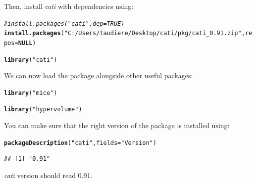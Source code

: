 \documentclass[12pt]{article}\usepackage[]{graphicx}\usepackage[]{color}
\makeatletter
\newcommand{\hlstr}[1]{\textcolor[rgb]{0.192,0.494,0.8}{#1}}%
\newcommand{\hlcom}[1]{\textcolor[rgb]{0.678,0.584,0.686}{\textit{#1}}}%
\newcommand{\hlstd}[1]{\textcolor[rgb]{0.345,0.345,0.345}{#1}}%
\newcommand{\hlkwa}[1]{\textcolor[rgb]{0.161,0.373,0.58}{\textbf{#1}}}%
\newcommand{\hlkwc}[1]{\textcolor[rgb]{0.333,0.667,0.333}{#1}}%
\newcommand{\hlkwd}[1]{\textcolor[rgb]{0.737,0.353,0.396}{\textbf{#1}}}%
\newenvironment{kframe}{%
 \def\at@end@of@kframe{}%
 \ifinner\ifhmode%
  \def\at@end@of@kframe{\end{minipage}}%
  \begin{minipage}{\columnwidth}%
 \fi\fi%
 \def\FrameCommand##1{\hskip\@totalleftmargin \hskip-\fboxsep
 \colorbox{shadecolor}{##1}\hskip-\fboxsep
     \hskip-\linewidth \hskip-\@totalleftmargin \hskip\columnwidth}%
 \MakeFramed {\advance\hsize-\width
   \@totalleftmargin\z@ \linewidth\hsize
   \@setminipage}}%
 {\par\unskip\endMakeFramed%
 \at@end@of@kframe}
\newenvironment{knitrout}{}{} %
\makeatother
\begin{document}
Then, install \textit{cati} with dependencies using:
\begin{knitrout}
\color{fgcolor}\begin{kframe}
\begin{alltt}
\hlcom{#install.packages("cati", dep=TRUE)}
\hlkwd{install.packages}\hlstd{(}\hlstr{"C:/Users/taudiere/Desktop/cati/pkg/cati_0.91.zip"}\hlstd{,} \hlkwc{repos}\hlstd{=}\hlkwa{NULL}\hlstd{)}
\end{alltt}


{\ttfamily\noindent\itshape\color{messagecolor}{\#\# Installing package into 'C:/Users/taudiere/Documents/R/win-library/3.1'\\\#\# (as 'lib' is unspecified)}}\begin{alltt}
\hlkwd{library}\hlstd{(}\hlstr{"cati"}\hlstd{)}
\end{alltt}


{\ttfamily\noindent\itshape\color{messagecolor}{\#\# Loading required package: nlme\\\#\# Loading required package: ade4\\\#\# Loading required package: ape}}\end{kframe}
\end{knitrout}

We can now load the package alongside other useful packages:
\begin{knitrout}
\color{fgcolor}\begin{kframe}
\begin{alltt}
\hlkwd{library}\hlstd{(}\hlstr{"mice"}\hlstd{)}
\end{alltt}


{\ttfamily\noindent\itshape\color{messagecolor}{\#\# Loading required package: Rcpp\\\#\# Loading required package: lattice\\\#\# mice 2.22 2014-06-10}}\begin{alltt}
\hlkwd{library}\hlstd{(}\hlstr{"hypervolume"}\hlstd{)}
\end{alltt}


{\ttfamily\noindent\itshape\color{messagecolor}{\#\# Loading required package: rgl}}\end{kframe}
\end{knitrout}

\noindent You can make sure that the right version of the package is installed using:
\begin{knitrout}
\color{fgcolor}\begin{kframe}
\begin{alltt}
\hlkwd{packageDescription}\hlstd{(}\hlstr{"cati"}\hlstd{,} \hlkwc{fields} \hlstd{=} \hlstr{"Version"}\hlstd{)}
\end{alltt}
\begin{verbatim}
## [1] "0.91"
\end{verbatim}
\end{kframe}
\end{knitrout}
\textit{cati} version should read 0.91.
\end{document}
